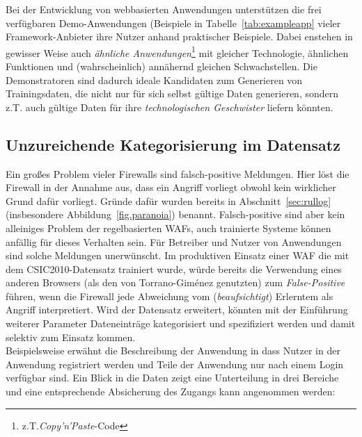 \subsubsection{}
Bei der Entwicklung von webbasierten Anwendungen unterstützen die frei verfügbaren Demo-Anwendungen (Beispiele in Tabelle~\ref{tab:exampleapp} vieler Framework-Anbieter ihre Nutzer anhand praktischer Beispiele. Dabei enstehen in gewisser Weise auch \emph{ähnliche Anwendungen}\footnote{z.T.\emph{Copy'n'Paste}-Code} mit gleicher Technologie, ähnlichen Funktionen und (wahrscheinlich) annähernd gleichen Schwachstellen. Die Demonstratoren sind dadurch ideale Kandidaten zum Generieren von Trainingsdaten, die nicht nur für sich selbst gültige Daten generieren, sondern z.T. auch gültige Daten für ihre \glqq\emph{technologischen Geschwister}\glqq{} liefern könnten.


\subsection{Unzureichende Kategorisierung im Datensatz}
\label{sec:Kategorisierung}
Ein großes Problem vieler Firewalls sind falsch-positive Meldungen. Hier löst die Firewall in der Annahme aus, dass ein Angriff vorliegt obwohl kein wirklicher Grund dafür vorliegt. Gründe dafür wurden bereits in Abschnitt~\ref{sec:rullog} (insbesondere Abbildung~\ref{fig.paranoia}) benannt. Falsch-positive sind aber kein alleiniges Problem der regelbasierten WAFs, auch trainierte Systeme können anfällig für dieses Verhalten sein. Für Betreiber und Nutzer von Anwendungen sind solche Meldungen unerwünscht. Im produktiven Einsatz einer WAF die mit dem CSIC2010-Datensatz trainiert wurde, würde bereits die Verwendung eines anderen Browsers (als den von Torrano-Giménez genutzten) zum \emph{False-Positive} führen, wenn die Firewall jede Abweichung vom (\emph{beaufsichtigt}) Erlerntem als Angriff interpretiert. Wird der Datensatz erweitert, könnten mit der Einführung weiterer Parameter Dateneinträge kategorisiert und spezifiziert werden und damit selektiv zum Einsatz kommen.\\ Beispielsweise erwähnt die Beschreibung der Anwendung in \cite{csic2010} dass Nutzer in der Anwendung registriert werden und Teile der Anwendung nur nach einem Login verfügbar sind. Ein Blick in die Daten zeigt eine Unterteilung in drei Bereiche und eine entsprechende Absicherung des Zugangs kann angenommen werden: 

